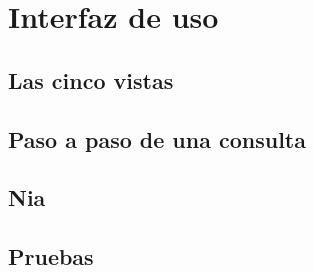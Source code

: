 \section{Interfaz de uso}\label{sec:interfaz}

\subsection{Las cinco vistas}

\subsection{Paso a paso de una consulta}

\subsection{Nia}

\subsection{Pruebas}
